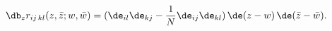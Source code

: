 \begin{equation}
\db_z r_{ij\,kl}(z,\bar{z};w,\bar{w})=(\de_{il}\de_{kj}-\frac{1}{N}\de_{ij}\de_{kl})
\,\de(z-w)\,\de(\bar{z}-\bar{w}).
\label{Green1}
\end{equation}

